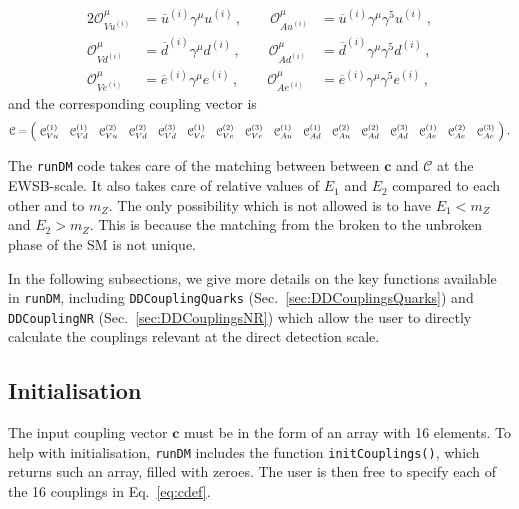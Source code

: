 \documentclass[notitlepage,12pt]{article}
\newcommand{\runDM}{\texttt{runDM}\xspace}
\newcommand\scalemath[2]{\scalebox{#1}{\mbox{\ensuremath{\displaystyle #2}}}}
\begin{document}
\begin{alignat}{2}
\mathcal{O}_{Vu^{(i)}}^\mu &= \overline{u}^{(i)} \gamma^\mu u^{(i)}\,, \qquad \mathcal{O}_{Au^{(i)}}^\mu &= \overline{u}^{(i)} \gamma^\mu \gamma^5 u^{(i)}\,, \nonumber \\
\mathcal{O}_{Vd^{(i)}}^\mu &= \overline{d}^{(i)} \gamma^\mu d^{(i)}\,, \qquad \mathcal{O}_{Ad^{(i)}}^\mu &=  \overline{d}^{(i)} \gamma^\mu \gamma^5 d^{(i)}\,,\\
\mathcal{O}_{Ve^{(i)}}^\mu &= \overline{e}^{(i)} \gamma^\mu e^{(i)}\,, \qquad \mathcal{O}_{Ae^{(i)}}^\mu &=  \overline{e}^{(i)} \gamma^\mu \gamma^5 e^{(i)}\,, \nonumber
\end{alignat}
and the corresponding coupling vector is
\begin{align}
\scalemath{0.9}{\mathcal{C} = \left(\!\begin{array}{cccccccccccccccc}
\mathcal{C}_{ Vu}^{(1)} & \mathcal{C}_{ Vd}^{(1)} & \mathcal{C}_{ Vu}^{(2)} & \mathcal{C}_{ Vd}^{(2)} & \mathcal{C}_{ Vd}^{(3)} & 
\mathcal{C}_{ Ve}^{(1)} &\mathcal{C}_{ Ve}^{(2)}  & \mathcal{C}_{ Ve}^{(3)}  & \mathcal{C}_{ Au}^{(1)} & \mathcal{C}_{ Ad}^{(1)} & \mathcal{C}_{ Au}^{(2)} & \mathcal{C}_{ Ad}^{(2)} & \mathcal{C}_{ Ad}^{(3)} & 
\mathcal{C}_{ Ae}^{(1)} &\mathcal{C}_{ Ae}^{(2)}  & \mathcal{C}_{ Ae}^{(3)} \end{array}\!\right) }\,.
\label{eq:cdef2}
\end{align}

The \runDM code takes care of the matching between between $\mathbf{c}$ and $\mathcal{C}$ at the EWSB-scale. It also takes care of relative values of $E_1$ and $E_2$ compared to each other and to $m_Z$. The only possibility which is not allowed is to have $E_1 < m_Z$ and $E_2 > m_Z$. This is because the matching from the broken to the unbroken phase of the SM is not unique.

In the following subsections, we give more details on the key functions available in \runDM, including \texttt{DDCouplingQuarks} (Sec.~\ref{sec:DDCouplingsQuarks}) and \texttt{DDCouplingNR} (Sec.~\ref{sec:DDCouplingsNR}) which allow the user to directly calculate the couplings relevant at the direct detection scale.

\subsection{Initialisation}
\label{sec:init}

The input coupling vector $\mathbf{c}$ must be in the form of an array with 16 elements. To help with initialisation, \runDM includes the function \texttt{initCouplings()}, which returns such an array, filled with zeroes. The user is then free to specify each of the 16 couplings in Eq.~\ref{eq:cdef}.
\end{document}
